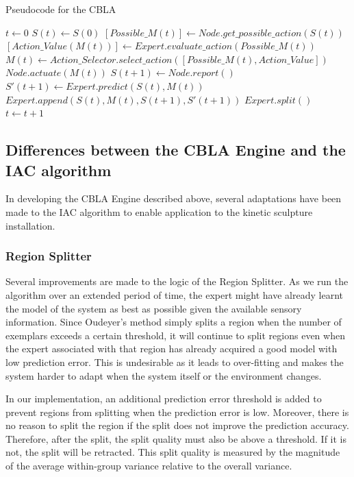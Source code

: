 \begin{algorithm}[!htbp]
	\caption{Pseudocode for the CBLA} 
	\label{alg:pseudocode-cbla}
	\begin{algorithmic} [1]
		\State $t\gets 0$
		\State $S(t)\gets S(0)$
		\Loop
			\State $[Possible\_M(t)] \gets Node.get\_possible\_action(S(t)) $
			\State $[Action\_Value(M(t))] \gets Expert.evaluate\_action(Possible\_M(t))$
			\State $M(t) \gets Action\_Selector.select\_action([Possible\_M(t), Action\_Value]) $
			\State $Node.actuate(M(t)) $
			\State $S(t+1) \gets Node.report()$
			\State $S'(t+1) \gets Expert.predict(S(t), M(t))$
			\State $Expert.append(S(t), M(t), S(t+1), S'(t+1))$
			\State $Expert.split()$
			\State $t \gets t + 1 $
		\EndLoop
	\end{algorithmic}
\end{algorithm}


\subsection{Differences between the CBLA Engine and the IAC algorithm}

In developing the CBLA Engine described above, several adaptations have been made to the IAC algorithm to enable application to the kinetic sculpture installation. 

\subsubsection{Region Splitter}

Several improvements are made to the logic of the Region Splitter. As we run the algorithm over an extended period of time, the expert might have already learnt the model of the system as best as possible given the available sensory information. Since Oudeyer's method simply splits a region when the number of exemplars exceeds a certain threshold, it will continue to split regions even when the expert associated with that region has already acquired a good model with low prediction error. This is undesirable as it leads to over-fitting and makes the system harder to adapt when the system itself or the environment changes. 

In our implementation, an additional prediction error threshold is added to prevent regions from splitting when the prediction error is low. Moreover, there is no reason to split the region if the split does not improve the prediction accuracy. Therefore, after the split, the split quality must also be above a threshold. If it is not, the split will be retracted. This split quality is measured by the magnitude of the average within-group variance relative to the overall variance.

